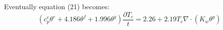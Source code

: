 Eventually equation (21) becomes:
\begin{equation}
(c_p^e \theta^e + 4.186 \theta^f + 1.996 \theta^g) \frac{\partial T_c}{t} = 2.26 + 2.19 T_c \nabla \cdot ( K_w  \theta^g)
\end{equation}